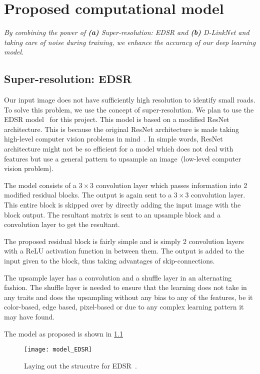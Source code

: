\chapter{Proposed computational model}\label{chapt:model}
\textit{By combining the power of \textbf{(a)} Super-resolution: EDSR and \textbf{(b)} D-LinkNet and taking care of noise during training, we enhance the accuracy of our deep learning model.}

\section{Super-resolution: EDSR}
Our input image does not have sufficiently high resolution to identify small roads. To solve this problem, we use the concept of super-resolution. We plan to use the EDSR model~\cite{EDSR} for this project. This model is based on a modified ResNet architecture. This is because the original ResNet architecture is made taking high-level computer vision problems in mind~\cite{khan2019surveyResNet}. In simple words, ResNet architecture might not be so efficient for a model which does not deal with features but use a general pattern to upsample an image~(low-level computer vision problem). 

The model consists of a $3\times3$ convolution layer which passes information into 2 modified residual blocks. The output is again sent to a $3\times3$ convolution layer. This entire block is skipped over by directly adding the input image with the block output. The resultant matrix is sent to an upsample block and a convolution layer to get the resultant.

The proposed residual block is fairly simple and is simply 2 convolution layers with a ReLU activation function in between them. The output is added to the input given to the block, thus taking advantages of skip-connections.

The upsample layer has a convolution and a shuffle layer in an alternating fashion. The shuffle layer is needed to ensure that the learning does not take in any traits and does the upsampling without any bias to any of the features, be it color-based, edge based, pixel-based or due to any complex learning pattern it may have found.

The model as proposed is shown in \cref{fig:model_EDSR}

\begin{figure}[h!]
  \centering
  \texttt{[image: model\_EDSR]}
  \caption[Laying out the strucutre for EDSR]{Laying out the strucutre for EDSR~\cite{EDSR}.}
  \label{fig:model_EDSR}
\end{figure}


